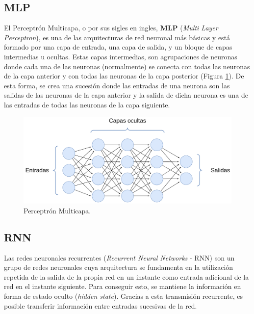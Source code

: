 
\subsection{MLP}
El Perceptrón Multicapa, o por sus sigles en ingles, \textbf{MLP} (\textit{Multi Layer Perceptron}), es una de las arquitecturas de red neuronal más básicas y está formado por una capa de entrada, una capa de salida, y un bloque de capas intermedias u ocultas. Estas capas intermedias, son agrupaciones de neuronas donde cada una de las neuronas (normalmente) se conecta con todas las neuronas de la capa anterior y con todas las neuronas de la capa posterior (Figura \ref{fig:mlp}). De esta forma, se crea una sucesión donde las entradas de una neurona son las salidas de las neuronas de la capa anterior y la salida de dicha neurona es una de las entradas de todas las neuronas de la capa siguiente. 

\begin{figure}[H]
\centering
\includegraphics[width=0.8\linewidth]{imagenes/mlp.png} 
\captionsetup{width=.8\linewidth}
\caption{Perceptrón Multicapa.}
\label{fig:mlp}
\end{figure}

\subsection{RNN}
Las redes neuronales recurrentes (\textit{Recurrent Neural Networks} - RNN) son un grupo de redes neuronales cuya arquitectura se fundamenta en la utilización repetida de la salida de la propia red en un instante como entrada adicional de la red en el instante siguiente. Para conseguir esto, se mantiene la información en forma de estado oculto (\textit{hidden state}). Gracias a esta transmisión recurrente, es posible transferir información entre entradas sucesivas de la red.

